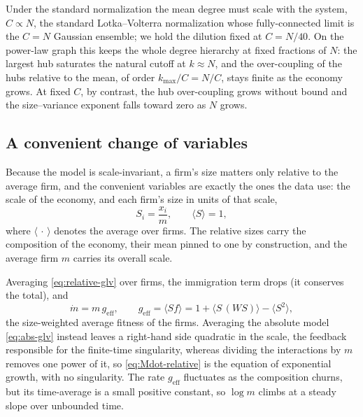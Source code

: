 Under the standard normalization the mean degree must scale with the system,
$C \propto N$, the standard Lotka--Volterra normalization whose fully-connected limit is the
$C = N$ Gaussian ensemble; we hold the dilution fixed at $C = N/40$. On the power-law
graph this keeps the whole degree hierarchy at fixed fractions of $N$: the largest hub
saturates the natural cutoff at $k \approx N$, and the over-coupling of the hubs relative
to the mean, of order $k_{\max}/C = N/C$, stays finite as the economy grows. At fixed $C$,
by contrast, the hub over-coupling grows without bound and the size--variance exponent
falls toward zero as $N$ grows.

\subsection{A convenient change of variables}
\label{sec:growth-churn}

Because the model is scale-invariant, a firm's size matters only relative to the average
firm, and the convenient variables are exactly the ones the data use: the scale of the
economy, and each firm's size in units of that scale,
\begin{equation}
    S_i = \frac{x_i}{m}, \qquad \langle S \rangle = 1,
\end{equation}
where $\langle\,\cdot\,\rangle$ denotes the average over firms. The relative sizes carry
the composition of the economy, their mean pinned to one by construction, and the average
firm $m$ carries its overall scale.

Averaging \eqref{eq:relative-glv} over firms, the immigration
term drops (it conserves the total), and
\begin{equation}
    \dot{m} = m\, g_{\mathrm{eff}},
    \qquad
    g_{\mathrm{eff}} = \langle S f \rangle
                     = 1 + \langle S\,(WS) \rangle - \langle S^2 \rangle ,
    \label{eq:Mdot-relative}
\end{equation}
the size-weighted average fitness of the firms. Averaging the absolute model
\eqref{eq:abs-glv} instead leaves a right-hand side quadratic in the scale, the feedback
responsible for the finite-time singularity, whereas dividing the interactions by $m$
removes one power of it, so \eqref{eq:Mdot-relative} is the equation of exponential
growth, with no singularity. The rate
$g_{\mathrm{eff}}$ fluctuates as the composition churns, but its time-average is a small
positive constant, so $\log m$ climbs at a steady slope over unbounded time.

